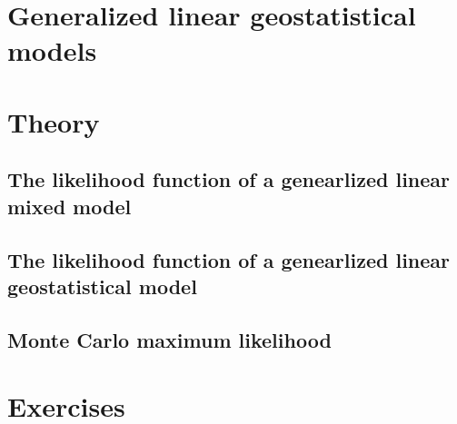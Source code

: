 \documentclass[
  letterpaper,
]{krantz}
\begin{document}
\hypertarget{generalized-linear-geostatistical-models}{%
\section{Generalized linear geostatistical
models}\label{generalized-linear-geostatistical-models}}

\hypertarget{theory}{%
\section{Theory}\label{theory}}

\hypertarget{the-likelihood-function-of-a-genearlized-linear-mixed-model}{%
\subsection{The likelihood function of a genearlized linear mixed
model}\label{the-likelihood-function-of-a-genearlized-linear-mixed-model}}

\hypertarget{the-likelihood-function-of-a-genearlized-linear-geostatistical-model}{%
\subsection{The likelihood function of a genearlized linear
geostatistical
model}\label{the-likelihood-function-of-a-genearlized-linear-geostatistical-model}}

\hypertarget{monte-carlo-maximum-likelihood}{%
\subsection{Monte Carlo maximum
likelihood}\label{monte-carlo-maximum-likelihood}}

\hypertarget{exercises}{%
\section{Exercises}\label{exercises}}
\end{document}
